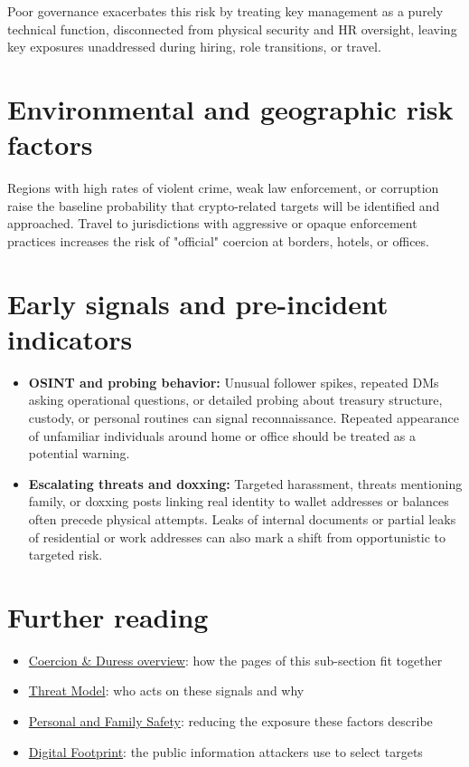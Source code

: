 Poor governance exacerbates this risk by treating key management as a purely technical function, disconnected from physical security and HR oversight, leaving key exposures unaddressed during hiring, role transitions, or travel.

\section{Environmental and geographic risk factors}\label{environmental-and-geographic-risk-factors}

Regions with high rates of violent crime, weak law enforcement, or corruption raise the baseline probability that crypto-related targets will be identified and approached. Travel to jurisdictions with aggressive or opaque enforcement practices increases the risk of "official" coercion at borders, hotels, or offices.

\section{Early signals and pre-incident indicators}\label{early-signals-and-pre-incident-indicators}

\begin{itemize}
\tightlist
\item
  \textbf{OSINT and probing behavior:} Unusual follower spikes, repeated DMs asking operational questions, or detailed probing about treasury structure, custody, or personal routines can signal reconnaissance. Repeated appearance of unfamiliar individuals around home or office should be treated as a potential warning.
\item
  \textbf{Escalating threats and doxxing:} Targeted harassment, threats mentioning family, or doxxing posts linking real identity to wallet addresses or balances often precede physical attempts. Leaks of internal documents or partial leaks of residential or work addresses can also mark a shift from opportunistic to targeted risk.
\end{itemize}

\section{Further reading}\label{further-reading-1}

\begin{itemize}
\tightlist
\item
  \href{https://frameworks.securityalliance.dev/physical-security/coercion-and-duress/overview}{Coercion \& Duress overview}: how the pages of this sub-section fit together
\item
  \href{https://frameworks.securityalliance.dev/physical-security/coercion-and-duress/threat-model}{Threat Model}: who acts on these signals and why
\item
  \href{https://frameworks.securityalliance.dev/physical-security/coercion-and-duress/personal-and-family-safety}{Personal and Family Safety}: reducing the exposure these factors describe
\item
  \href{https://frameworks.securityalliance.dev/privacy/digital-footprint}{Digital Footprint}: the public information attackers use to select targets
\end{itemize}

